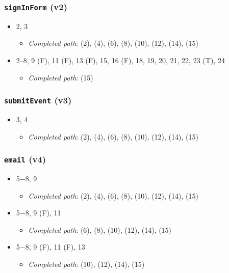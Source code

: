 \documentclass{article}
\newcommand{\completedpath}{\textit{Completed path}}
\begin{document}
\subsubsection*{\texttt{signInForm} (v2)}

\begin{itemize}
    \item 2, 3
          \begin{itemize}
              \item \completedpath: (2), (4), (6), (8), (10), (12), (14), (15)
          \end{itemize}
    \item 2--8, 9 (F), 11 (F), 13 (F), 15, 16 (F), 18, 19, 20, 21, 22, 23 (T), 24
          \begin{itemize}
              \item \completedpath: (15)
          \end{itemize}
\end{itemize}

\subsubsection*{\texttt{submitEvent} (v3)}

\begin{itemize}
    \item 3, 4
          \begin{itemize}
              \item \completedpath: (2), (4), (6), (8), (10), (12), (14), (15)
          \end{itemize}
\end{itemize}

\subsubsection*{\texttt{email} (v4)}

\begin{itemize}
    \item 5$-$8, 9
          \begin{itemize}
              \item \completedpath: (2), (4), (6), (8), (10), (12), (14), (15)
          \end{itemize}
    \item 5$-$8, 9 (F), 11
          \begin{itemize}
              \item \completedpath: (6), (8), (10), (12), (14), (15)
          \end{itemize}
    \item 5$-8$, 9 (F), 11 (F), 13
          \begin{itemize}
              \item \completedpath: (10), (12), (14), (15)
          \end{itemize}
\end{itemize}
\end{document}
